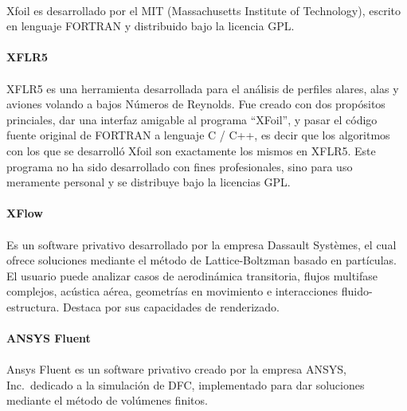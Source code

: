 \documentclass[letterpaper, openright, 12pt]{book}
\begin{document}
    \paragraph*{}
    Xfoil es desarrollado por el MIT (Massachusetts Institute of
    Technology), escrito en lenguaje FORTRAN y distribuido bajo
    la licencia GPL.

    \paragraph*{XFLR5}
    \paragraph*{}
    XFLR5 es una herramienta desarrollada para el análisis de perfiles alares,
    alas y aviones volando a bajos Números de Reynolds. Fue creado con dos
    propósitos princiales, dar una interfaz amigable al programa ``XFoil'', y
    pasar el código fuente original de FORTRAN a lenguaje C / C++, es decir que
    los algoritmos con los que se desarrolló Xfoil son exactamente los mismos
    en XFLR5.\cite{xflr5} Este programa no ha sido desarrollado con fines
    profesionales, sino para uso meramente personal y se distribuye bajo la
    licencias GPL.

    \paragraph*{XFlow}
    \paragraph*{}
    Es un software privativo desarrollado por la empresa Dassault Systèmes, el
    cual ofrece soluciones mediante el método de Lattice-Boltzman basado en
    partículas. El usuario puede analizar casos de aerodinámica transitoria,
    flujos multifase complejos, acústica aérea, geometrías en movimiento e
    interacciones fluido-estructura. Destaca por sus capacidades de
    renderizado.\cite{xflow}

    \paragraph*{ANSYS Fluent}
    \paragraph*{}
    Ansys Fluent es un software privativo creado por la empresa ANSYS, Inc.\
    dedicado a la simulación de DFC, implementado para dar soluciones mediante
    el método de volúmenes finitos.
\end{document}
